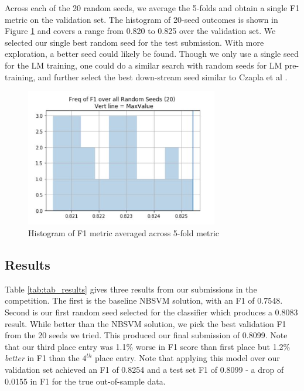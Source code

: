 \documentclass[runningheads]{llncs}
\begin{document}
Across each of the 20 random seeds, we average the 5-folds and obtain a single F1 metric on the validation set. The histogram of 20-seed outcomes is shown in Figure \ref{fig:random_seed_hist} and covers a range  from 0.820 to 0.825 over the validation set. We selected our single best random seed for the test submission. With more exploration, a better seed could likely be found.  Though we only use a single seed for the LM training, one could do a similar search with random seeds for LM pre-training, and further select the best down-stream seed similar to Czapla et al \cite{Poleval:DBLP:journals/corr/abs-1810-10222}.

\begin{figure}[ht]
	\includegraphics[width=0.75\textwidth]{seed_hist_f1}
	\caption{Histogram of F1 metric averaged across 5-fold metric}
	\label{fig:random_seed_hist}
\end{figure}

\subsection{Results}
Table \ref{tab:tab_results} gives three results from our submissions in the competition. The first is the baseline NBSVM solution, with an F1 of 0.7548.  Second is our first random seed selected for the classifier which produces a 0.8083 result.  While better than the NBSVM solution, we pick the best validation F1 from the 20 seeds we tried. This produced our final submission of 0.8099.  Note that our third place entry was 1.1\% worse in F1 score than first place but 1.2\% \textit{better} in F1 than the $4^{th}$ place entry. 
Note that applying this model over our validation set achieved an F1 of 0.8254 and a test set F1 of 0.8099 - a drop of 0.0155 in F1 for the true out-of-sample data.
\end{document}
